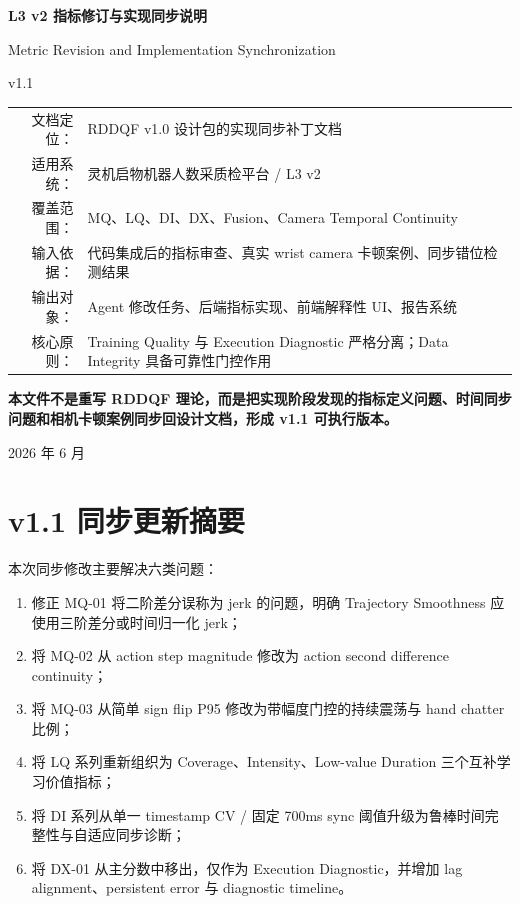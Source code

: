\documentclass[UTF8,zihao=-4]{ctexart}
\begin{document}
\begin{titlepage}
\centering
\vspace*{2.2cm}
{\Huge\bfseries L3 v2 指标修订与实现同步说明\par}
\vspace{0.35cm}
{\Large Metric Revision and Implementation Synchronization\par}
\vspace{0.6cm}
{\LARGE v1.1\par}
\vspace{1.15cm}
\begin{tabular}{rl}
文档定位： & RDDQF v1.0 设计包的实现同步补丁文档 \\
适用系统： & 灵机启物机器人数采质检平台 / L3 v2 \\
覆盖范围： & MQ、LQ、DI、DX、Fusion、Camera Temporal Continuity \\
输入依据： & 代码集成后的指标审查、真实 wrist camera 卡顿案例、同步错位检测结果 \\
输出对象： & Agent 修改任务、后端指标实现、前端解释性 UI、报告系统 \\
核心原则： & Training Quality 与 Execution Diagnostic 严格分离；Data Integrity 具备可靠性门控作用 \\
\end{tabular}
\vfill
\begin{minipage}{0.88\linewidth}
\centering\large\bfseries
本文件不是重写 RDDQF 理论，而是把实现阶段发现的指标定义问题、时间同步问题和相机卡顿案例同步回设计文档，形成 v1.1 可执行版本。
\end{minipage}
\vfill
{\large 2026 年 6 月\par}
\end{titlepage}

\tableofcontents
\newpage

\section{v1.1 同步更新摘要}

本次同步修改主要解决六类问题：

\begin{enumerate}
\item 修正 MQ-01 将二阶差分误称为 jerk 的问题，明确 Trajectory Smoothness 应使用三阶差分或时间归一化 jerk；
\item 将 MQ-02 从 action step magnitude 修改为 action second difference continuity；
\item 将 MQ-03 从简单 sign flip P95 修改为带幅度门控的持续震荡与 hand chatter 比例；
\item 将 LQ 系列重新组织为 Coverage、Intensity、Low-value Duration 三个互补学习价值指标；
\item 将 DI 系列从单一 timestamp CV / 固定 700ms sync 阈值升级为鲁棒时间完整性与自适应同步诊断；
\item 将 DX-01 从主分数中移出，仅作为 Execution Diagnostic，并增加 lag alignment、persistent error 与 diagnostic timeline。
\end{enumerate}
\end{document}
